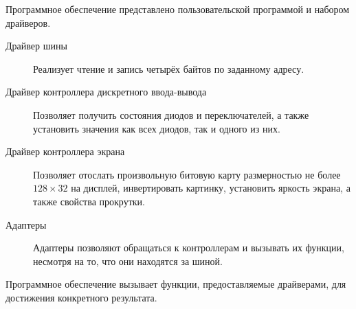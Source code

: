 \documentclass[12pt, a4paper] {ncc}
\begin{document}
Программное обеспечение представлено пользовательской программой и набором
драйверов.

\begin{description}
        \item[Драйвер шины] Реализует чтение и запись четырёх байтов по
                заданному адресу.
        \item[Драйвер контроллера дискретного ввода-вывода] Позволяет получить
                состояния диодов и переключателей, а также установить значения
                как всех диодов, так и одного из них.
        \item[Драйвер контроллера экрана] Позволяет отослать произвольную
                битовую карту размерностью не более $128 \times 32$ на дисплей,
                инвертировать картинку, установить яркость экрана, а также
                свойства прокрутки.
        \item[Адаптеры] Адаптеры позволяют обращаться к контроллерам и вызывать
                их функции, несмотря на то, что они находятся за шиной.
\end{description}

Программное обеспечение вызывает функции, предоставляемые драйверами, для
достижения конкретного результата.
\end{document}
